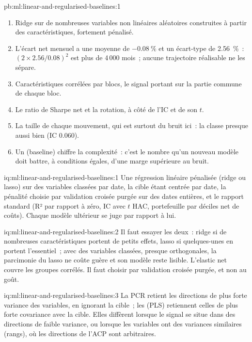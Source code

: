 \begin{solution}{pb:ml:linear-and-regularised-baselines:1}
\begin{enumerate}
\item Ridge sur de nombreuses variables non linéaires aléatoires construites à partir des caractéristiques, fortement pénalisé.
\item L'écart net mensuel a une moyenne de $-0.08~\%$ et un écart-type de 2.56~\%~: $(2\times2.56/0.08)^2$ est
plus de 4\,000 mois~; aucune trajectoire réalisable ne les sépare.
\item Caractéristiques corrélées par blocs, le signal portant sur la partie commune de chaque bloc.
\item Le ratio de Sharpe net et la rotation, à côté de l'IC et de son $t$.
\item La taille de chaque mouvement, qui est surtout du bruit ici~: la  classe presque aussi bien (IC 0.060).
\item Un  (baseline) chiffre la complexité~: c'est le nombre qu'un nouveau modèle doit battre, à conditions égales, d'une marge supérieure au bruit.
\end{enumerate}
\end{solution}

\begin{solution}{iq:ml:linear-and-regularised-baselines:1}
Une régression linéaire pénalisée (ridge ou lasso) sur des variables classées par date, la cible étant centrée par date, la pénalité
choisie par validation croisée purgée sur des dates entières, et le rapport standard (R² par rapport à zéro, IC avec $t$ HAC,
portefeuille par déciles net de coûts). Chaque modèle ultérieur se juge par rapport à lui.
\end{solution}

\begin{solution}{iq:ml:linear-and-regularised-baselines:2}
Il faut essayer les deux~: ridge si de nombreuses caractéristiques portent de petits effets, lasso si quelques-unes en portent l'essentiel~; avec des variables classées, presque orthogonales,
la parcimonie du lasso ne coûte guère et son modèle reste lisible. L'elastic net couvre les groupes corrélés. Il faut choisir
par validation croisée purgée, et non au goût.
\end{solution}

\begin{solution}{iq:ml:linear-and-regularised-baselines:3}
La PCR retient les directions de plus forte variance des variables, en ignorant la cible~; les  (PLS) retiennent celles de plus forte covariance avec
la cible. Elles diffèrent lorsque le signal se situe dans des directions de faible variance, ou lorsque les variables ont des variances similaires (rangs),
où les directions de l'ACP sont arbitraires.
\end{solution}

